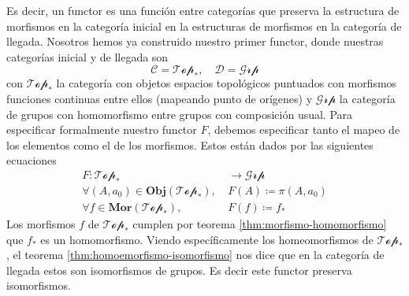 {Es decir, un functor es una función entre categorías que preserva la
estructura de morfismos en la categoría inicial en la estructuras de
morfismos en la categoría de llegada. Nosotros hemos ya construido
nuestro primer functor, donde nuestras categorías inicial y de llegada son
\[ \mathcal C = \mathscr{Top}_* ,  \quad \mathcal D
  = \mathscr{Grp} \]
con \(\mathcal {Top}_*\) la categoría con objetos espacios topológicos
puntuados con morfismos funciones continuas entre ellos (mapeando punto de
orígenes) y \(\mathscr{Grp}\) la categoría de grupos con homomorfismo entre
grupos con composición usual. Para especificar formalmente nuestro
functor \(F\), debemos especificar tanto el mapeo de los elementos como
el de los morfismos. Estos están dados por las siguientes ecuaciones
\begin{align*}
  F : \mathscr{Top}_* &\longrightarrow \mathscr{Grp} \\
  \forall (A, a_0) \in \mathbf{Obj} \left( \mathscr{Top}_* \right),\
    &F(A) \coloneqq \pi (A, a_0) \\
  \forall f \in \mathbf{Mor} \left( \mathscr{Top}_* \right),\ &F(f) \coloneqq
    f_*
\end{align*}
Los morfismos \(f\) de \(\mathscr{Top}_*\) cumplen por teorema
\ref{thm:morfismo-homomorfismo} que \(f_*\) es un homomorfismo. Viendo
específicamente los homeomorfismos de \(\mathscr{Top}_*\),
el teorema \ref{thm:homoemorfismo-isomorfismo} nos dice que en la
categoría de llegada estos son isomorfismos de grupos. Es decir este
functor preserva isomorfismos.
}